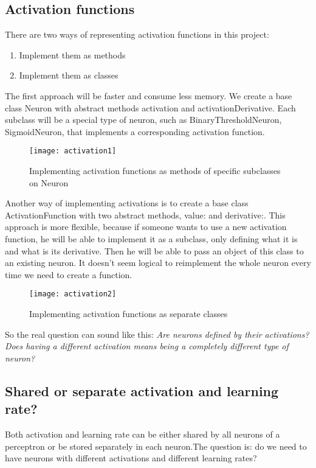 \subsection{Activation functions}
There are two ways of representing activation functions in this project:

\begin{enumerate}
  \item Implement them as methods
  \item Implement them as classes
\end{enumerate}

The first approach will be faster and consume less memory. We create a base class Neuron with abstract methods activation and activationDerivative. Each subclass will be a special type of neuron, such as BinaryThresholdNeuron, SigmoidNeuron, that implements a corresponding activation function.

\begin{figure}[H]
  \centering
  \texttt{[image: activation1]}
  \caption{Implementing activation functions as methods of specific subclasses on Neuron}
  \label{fig:activation1}
\end{figure}

Another way of implementing activations is to create a base class ActivationFunction with two abstract methods, value: and derivative:. This approach is more flexible, because if someone wants to use a new activation function, he will be able to implement it as a subclass, only defining what it is and what is its derivative. Then he will be able to pass an object of this class to an existing neuron. It doesn’t seem logical to reimplement the whole neuron every time we need to create a function.

\begin{figure}[H]
  \centering
  \texttt{[image: activation2]}
  \caption{Implementing activation functions as separate classes}
  \label{fig:activation2}
\end{figure}

So the real question can sound like this:
\textit{Are neurons defined by their activations? Does having a different activation means being a completely different type of neuron?}

\subsection{Shared or separate activation and learning rate?}
Both activation and learning rate can be either shared by all neurons of a perceptron or be stored separately in each neuron.The question is: do we need to have neurons with different activations and different learning rates?

